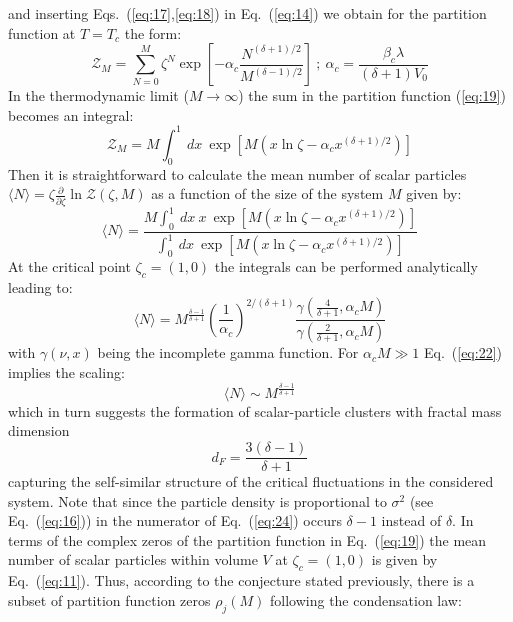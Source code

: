 \documentclass[aps,pre,showpacs,amsmath,amssymb,superscriptaddress,twocolumn]{revtex4-1}
\begin{document}
and inserting Eqs.~(\ref{eq:17},\ref{eq:18}) in Eq.~(\ref{eq:14}) we obtain for the partition function at $T=T_c$ the form:
\begin{equation}
\mathcal{Z}_M=\displaystyle{\sum_{N=0}^M} \zeta^N \exp[-\alpha_c \frac{N^{(\delta + 1)/2}}{M^{(\delta - 1)/2}}]~;~\alpha_c=\frac{\beta_c \lambda}{(\delta +1) V_0} 
\label{eq:19}
\end{equation}
In the thermodynamic limit ($M \to \infty$) the sum in the partition function (\ref{eq:19}) becomes an integral:
\begin{equation}
\mathcal{Z}_M=M \int_0^1~dx~\exp[M(x \ln \zeta - \alpha_c x^{(\delta + 1)/2})]
\label{eq:20}
\end{equation}
Then it is straightforward to calculate the mean number of scalar particles $\langle N \rangle =\zeta \frac{\partial}{\partial \zeta} \ln \mathcal{Z}(\zeta,M)$ as a function of the size of the system $M$ given by:
\begin{equation}
\langle N \rangle = \frac{M  \int_0^1~dx~x~\exp[M(x \ln \zeta - \alpha_c x^{(\delta + 1)/2})]}
{\int_0^1~dx~\exp[M(x \ln \zeta - \alpha_c x^{(\delta + 1)/2})]}
\label{eq:21}
\end{equation}
At the critical point $\zeta_c=(1,0)$ the integrals can be performed analytically leading to:
\begin{equation}
\langle N \rangle = M^{\frac{\delta - 1}{\delta +1}} \left(\frac{1}{\alpha_c}\right)^{2/(\delta +1)} \frac{\gamma(\frac{4}{\delta +1}, \alpha_c M)}{\gamma(\frac{2}{\delta +1}, \alpha_c M)}
\label{eq:22}
\end{equation}
with $\gamma(\nu,x)$ being the incomplete gamma function. For $\alpha_c M \gg 1$ Eq.~(\ref{eq:22}) implies the scaling:
\begin{equation}
\langle N \rangle \sim M^{\frac{\delta - 1}{\delta +1}}
\label{eq:23}
\end{equation}
which in turn suggests the formation of scalar-particle clusters with fractal mass dimension
\begin{equation}
d_F=\frac{3 (\delta -1)}{\delta + 1}
\label{eq:24}
\end{equation}
capturing the self-similar structure of the critical fluctuations in the considered system. Note that since the particle density is proportional to $\sigma^2$ (see Eq.~(\ref{eq:16})) in the numerator of Eq.~(\ref{eq:24}) occurs $\delta -1$ instead of $\delta$. In terms of the complex zeros of the partition function in Eq.~(\ref{eq:19}) the mean number of scalar particles within volume $V$ at $\zeta_c=(1,0)$ is given by Eq.~(\ref{eq:11}). Thus, according to the conjecture stated previously, there is a subset of partition function zeros $\rho_j(M)$ following the condensation law:
\end{document}
